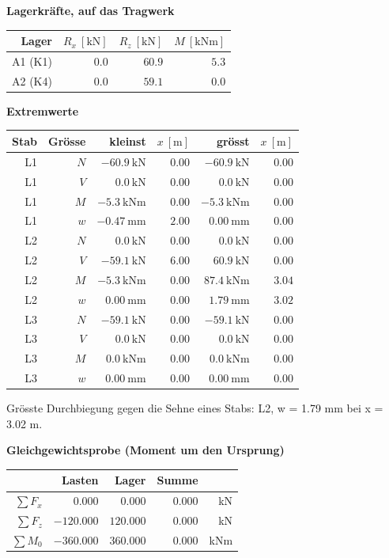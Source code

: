 \documentclass[11pt,a4paper]{article}
\begin{document}
\noindent\textbf{Lagerkräfte, auf das Tragwerk}
\begin{longtable}{rrrr}
\hline
Lager & $R_x\ [\mathrm{kN}]$ & $R_z\ [\mathrm{kN}]$ & $M\ [\mathrm{kNm}]$ \\
\hline
\endhead
A1 (K1) & $0.0$ & $60.9$ & $5.3$ \\
A2 (K4) & $0.0$ & $59.1$ & $0.0$ \\
\hline
\end{longtable}
\noindent\textbf{Extremwerte}
\begin{longtable}{rrrrrr}
\hline
Stab & Grösse & kleinst & $x\ [\mathrm{m}]$ & grösst & $x\ [\mathrm{m}]$ \\
\hline
\endhead
L1 & $N$ & $-60.9\ \mathrm{kN}$ & $0.00$ & $-60.9\ \mathrm{kN}$ & $0.00$ \\
L1 & $V$ & $0.0\ \mathrm{kN}$ & $0.00$ & $0.0\ \mathrm{kN}$ & $0.00$ \\
L1 & $M$ & $-5.3\ \mathrm{kNm}$ & $0.00$ & $-5.3\ \mathrm{kNm}$ & $0.00$ \\
L1 & $w$ & $-0.47\ \mathrm{mm}$ & $2.00$ & $0.00\ \mathrm{mm}$ & $0.00$ \\
L2 & $N$ & $0.0\ \mathrm{kN}$ & $0.00$ & $0.0\ \mathrm{kN}$ & $0.00$ \\
L2 & $V$ & $-59.1\ \mathrm{kN}$ & $6.00$ & $60.9\ \mathrm{kN}$ & $0.00$ \\
L2 & $M$ & $-5.3\ \mathrm{kNm}$ & $0.00$ & $87.4\ \mathrm{kNm}$ & $3.04$ \\
L2 & $w$ & $0.00\ \mathrm{mm}$ & $0.00$ & $1.79\ \mathrm{mm}$ & $3.02$ \\
L3 & $N$ & $-59.1\ \mathrm{kN}$ & $0.00$ & $-59.1\ \mathrm{kN}$ & $0.00$ \\
L3 & $V$ & $0.0\ \mathrm{kN}$ & $0.00$ & $0.0\ \mathrm{kN}$ & $0.00$ \\
L3 & $M$ & $0.0\ \mathrm{kNm}$ & $0.00$ & $0.0\ \mathrm{kNm}$ & $0.00$ \\
L3 & $w$ & $0.00\ \mathrm{mm}$ & $0.00$ & $0.00\ \mathrm{mm}$ & $0.00$ \\
\hline
\end{longtable}
Grösste Durchbiegung gegen die Sehne eines Stabs: L2, w = 1.79 mm bei x = 3.02 m.

\noindent\textbf{Gleichgewichtsprobe (Moment um den Ursprung)}
\begin{longtable}{rrrrr}
\hline
 & Lasten & Lager & Summe &  \\
\hline
\endhead
$\sum F_x$ & $0.000$ & $0.000$ & $0.000$ & kN \\
$\sum F_z$ & $-120.000$ & $120.000$ & $0.000$ & kN \\
$\sum M_0$ & $-360.000$ & $360.000$ & $0.000$ & kNm \\
\hline
\end{longtable}
\end{document}
